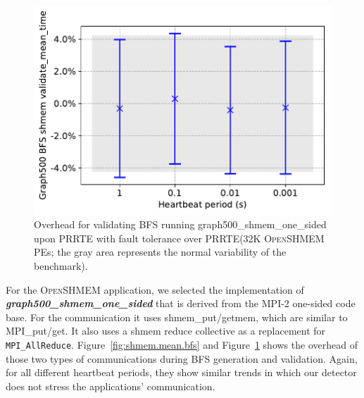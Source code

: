 \documentclass[5p,times,twocolumn]{elsarticle}
\newcommand{\mpifunc}[1]{\lstinline"MPI_#1"\xspace}
\newcommand{\prrte}[0]{\textsc{PRRTE}\xspace}
\newcommand{\mpi}[0]{\textsc{MPI}\xspace}
\newcommand{\oshmem}[0]{\textsc{OpenSHMEM}\xspace}
\begin{document}
\begin{figure}[h]
  \centering
  \includegraphics[width=\linewidth]{shmem_validate_bfs.pdf}
  \caption{Overhead for validating BFS running graph500\_shmem\_one\_sided upon \prrte with fault tolerance over \prrte (32K \oshmem PEs; the gray area represents the normal variability of the benchmark).}
  \label{fig:shmem.validate.bfs}
\end{figure}
For the \oshmem application, we selected the implementation of \textbf{\emph{graph500\_shmem\_one\_sided}} that
is derived from the \mpi-2 one-sided code base.
For the communication it uses shmem\_put/getmem, which are similar to MPI\_put/get. It also uses a shmem reduce collective as a replacement for \mpifunc{AllReduce}.
Figure~\ref{fig:shmem.mean.bfs} and Figure~\ref{fig:shmem.validate.bfs} shows the overhead of
those two types of communications during BFS generation and validation.
Again, for all different heartbeat periods, they show similar trends in which our detector does not stress the applications' communication.
\end{document}
